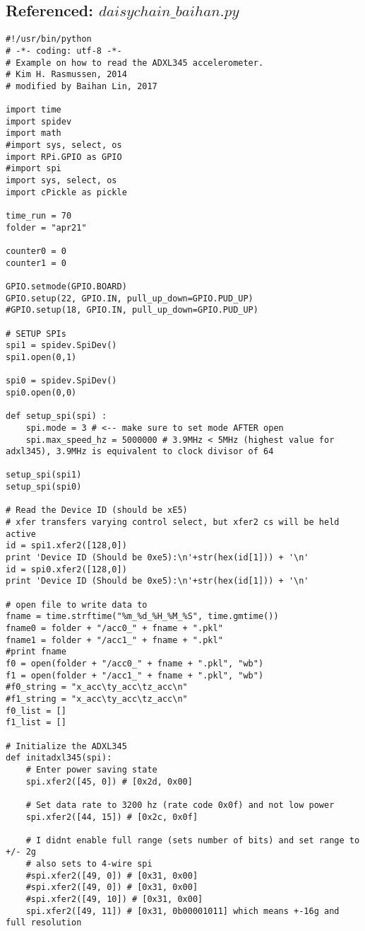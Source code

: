 \documentclass{sigchi}
\begin{document}
\subsection{Referenced: $daisychain\_baihan.py$}\label{ss:daisy}
\begin{lstlisting}
#!/usr/bin/python
# -*- coding: utf-8 -*-
# Example on how to read the ADXL345 accelerometer.
# Kim H. Rasmussen, 2014
# modified by Baihan Lin, 2017

import time
import spidev
import math
#import sys, select, os
import RPi.GPIO as GPIO
#import spi
import sys, select, os
import cPickle as pickle

time_run = 70
folder = "apr21"

counter0 = 0
counter1 = 0

GPIO.setmode(GPIO.BOARD)
GPIO.setup(22, GPIO.IN, pull_up_down=GPIO.PUD_UP)
#GPIO.setup(18, GPIO.IN, pull_up_down=GPIO.PUD_UP)

# SETUP SPIs
spi1 = spidev.SpiDev()
spi1.open(0,1)

spi0 = spidev.SpiDev()
spi0.open(0,0)

def setup_spi(spi) :
    spi.mode = 3 # <-- make sure to set mode AFTER open
    spi.max_speed_hz = 5000000 # 3.9MHz < 5MHz (highest value for adxl345), 3.9MHz is equivalent to clock divisor of 64

setup_spi(spi1)
setup_spi(spi0)

# Read the Device ID (should be xE5)
# xfer transfers varying control select, but xfer2 cs will be held active
id = spi1.xfer2([128,0])
print 'Device ID (Should be 0xe5):\n'+str(hex(id[1])) + '\n'
id = spi0.xfer2([128,0])
print 'Device ID (Should be 0xe5):\n'+str(hex(id[1])) + '\n'

# open file to write data to
fname = time.strftime("%m_%d_%H_%M_%S", time.gmtime())
fname0 = folder + "/acc0_" + fname + ".pkl"
fname1 = folder + "/acc1_" + fname + ".pkl"
#print fname
f0 = open(folder + "/acc0_" + fname + ".pkl", "wb")
f1 = open(folder + "/acc1_" + fname + ".pkl", "wb")
#f0_string = "x_acc\ty_acc\tz_acc\n"
#f1_string = "x_acc\ty_acc\tz_acc\n"
f0_list = []
f1_list = []

# Initialize the ADXL345
def initadxl345(spi):
    # Enter power saving state
    spi.xfer2([45, 0]) # [0x2d, 0x00]

    # Set data rate to 3200 hz (rate code 0x0f) and not low power
    spi.xfer2([44, 15]) # [0x2c, 0x0f]

    # I didnt enable full range (sets number of bits) and set range to +/- 2g 
    # also sets to 4-wire spi
    #spi.xfer2([49, 0]) # [0x31, 0x00]
    #spi.xfer2([49, 0]) # [0x31, 0x00]
    #spi.xfer2([49, 10]) # [0x31, 0x00]
    spi.xfer2([49, 11]) # [0x31, 0b00001011] which means +-16g and full resolution
    


\end{lstlisting}
\end{document}
